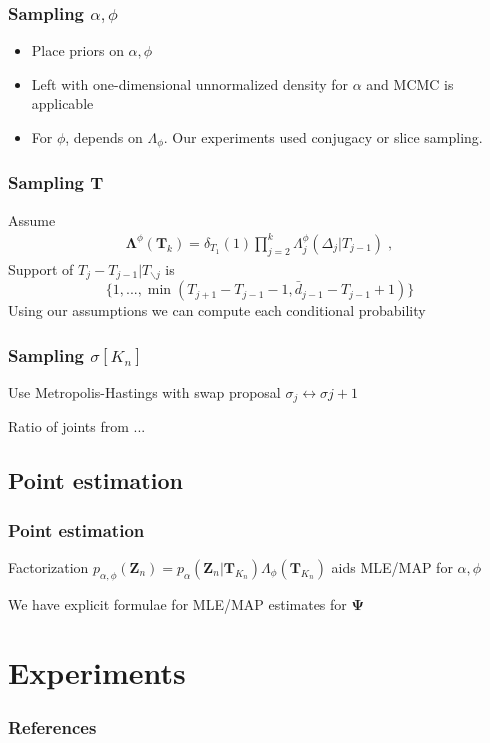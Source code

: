 \documentclass[final,hyperref={pdfpagelabels=false},noamsthm]{beamer}
\def\aDist{\Lambda}
\newcommand{\ee}{Z} %
\newcommand{\bfee}{\mathbf{\ee}}
\newcommand{\bfT}{\mathbf{T}}
\newcommand{\bfPsi}{\boldsymbol{\Psi}}
\begin{document}
\begin{frame}
	\frametitle{Sampling $\alpha, \phi$}
	\begin{itemize}
		\item Place priors on $\alpha, \phi$
		\item Left with one-dimensional unnormalized density for $\alpha$ and MCMC is applicable
		\item For $\phi$, depends on $\Lambda_\phi$. Our experiments used conjugacy or slice sampling.
	\end{itemize}

\end{frame}

\begin{frame}
	\frametitle{Sampling $\bfT$}
	Assume
	\begin{align*}
	\boldsymbol{\aDist}^{\phi}(\bfT_k) = \delta_{T_1}(1) \prod_{j=2}^k \aDist_j^{\phi}(\Delta_j | T_{j-1}) \;,
	\end{align*}
	Support of $T_j - T_{j-1} | T_{\backslash j}$ is
	\begin{equation*}
		\{ 1, ..., \min(T_{j+1} - T_{j-1} - 1, \bar{d}_{j-1} - T_{j-1} + 1)  \}
	\end{equation*}
	Using our assumptions we can compute each conditional probability
\end{frame}

\begin{frame}
	\frametitle{Sampling $\sigma[K_n]$}
	Use Metropolis-Hastings with swap proposal $\sigma_j \leftrightarrow \sigma{j+1}$
	
	Ratio of joints from ...
\end{frame}

\subsection{Point estimation}
\begin{frame}
	\frametitle{Point estimation}
	Factorization $p_{\alpha, \phi}(\bfee_n) = p_\alpha (\bfee_n | \bfT_{K_n})\Lambda_\phi(\bfT_{K_n})$ aids MLE/MAP for $\alpha, \phi$
	
	We have explicit formulae for MLE/MAP estimates for $\bfPsi$
\end{frame}

\section{Experiments}


\begin{frame}
	\frametitle{References}
	\footnotesize{
	}
\end{frame}
\end{document}
